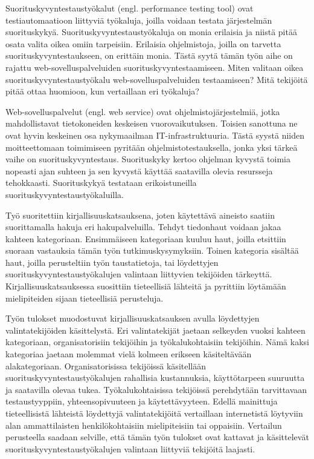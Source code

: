 Suorituskyvyntestaustyökalut (engl. performance testing tool) ovat testiautomaatioon liittyviä työkaluja, joilla voidaan testata järjestelmän suorituskykyä. Suorituskyvyntestaustyökaluja on monia erilaisia ja niistä pitää osata valita oikea omiin tarpeisiin. Erilaisia ohjelmistoja, joilla on tarvetta suorituskyvyntestaukseen, on erittäin monia. Tästä syytä tämän työn aihe on rajattu web-sovelluspalveluiden suorituskyvyntestaamiseen. Miten valitaan oikea suorituskyvyntestaustyökalu web-sovelluspalveluiden testaamiseen? Mitä tekijöitä pitää ottaa huomioon, kun vertaillaan eri työkaluja?


Web-sovelluspalvelut (engl. web service) ovat ohjelmistojärjestelmiä, jotka mahdollistavat tietokoneiden keskeisen vuorovaikutuksen. Toisien sanottuna ne ovat hyvin keskeinen osa nykymaailman IT-infrastruktuuria. Tästä syystä niiden moitteettomaan toimimiseen pyritään ohjelmistotestauksella, jonka yksi tärkeä vaihe on suorituskyvyntestaus. Suorituskyky kertoo ohjelman kyvystä toimia nopeasti ajan suhteen ja sen kyvystä käyttää saatavilla olevia resursseja tehokkaasti. Suorituskykyä testataan erikoistuneilla suorituskyvyntestaustyökaluilla.


Työ suoritettiin kirjallisuuskatsauksena, joten käytettävä aineisto saatiin suorittamalla hakuja eri hakupalveluilla. Tehdyt tiedonhaut voidaan jakaa kahteen kategoriaan. Ensimmäiseen kategoriaan kuuluu haut, joilla etsittiin suoraan vastauksia tämän työn tutkimuskysymyksiin. Toinen kategoria sisältää haut, joilla perusteltiin työn taustatietoja, tai löydettyjen suorituskyvyntestaustyökalujen valintaan liittyvien tekijöiden tärkeyttä. Kirjallisuuskatsauksessa suosittiin tieteellisiä lähteitä ja pyrittiin löytämään mielipiteiden sijaan tieteellisiä perusteluja.


Työn tulokset muodostuvat kirjallisuuskatsauksen avulla löydettyjen valintatekijöiden käsittelystä. Eri valintatekijät jaetaan selkeyden vuoksi kahteen kategoriaan, organisatorisiin tekijöihin ja työkalukohtaisiin tekijöihin. Nämä kaksi kategoriaa jaetaan molemmat vielä kolmeen erikseen käsiteltävään alakategoriaan. Organisatorisissa tekijöissä käsitellään suorituskyvyntestaustyökalujen rahallisia kustannuksia, käyttötarpeen suuruutta ja saatavilla olevaa tukea. Työkalukohtaisissa tekijöissä perehdytään tarvittavaan testaustyyppiin, yhteensopivuuteen ja käytettävyyteen. Edellä mainittuja tieteellisistä lähteistä löydettyjä valintatekijöitä vertaillaan internetistä löytyviin alan ammattilaisten henkilökohtaisiin mielipiteisiin tai oppaisiin. Vertailun perusteella saadaan selville, että tämän työn tulokset ovat kattavat ja käsittelevät suorituskyvyntestaustyökalujen valintaan liittyviä tekijöitä laajasti.
